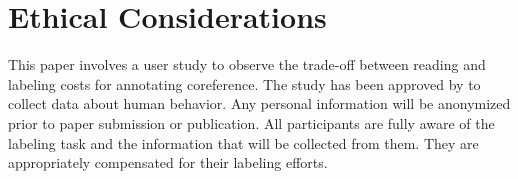 \section{Ethical Considerations}

This paper involves a user study to observe the trade-off between reading and labeling costs for annotating coreference.
The study has been approved by  to collect data about human behavior.
Any personal information will be anonymized prior to paper submission or publication.
All participants are fully aware of the labeling task and the information that
will be collected from them. They are appropriately compensated for their
labeling efforts.
